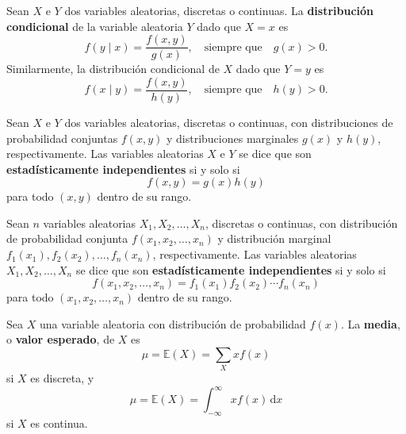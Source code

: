 \begin{definition}[]
Sean $X$ e $Y$ dos variables aleatorias, discretas o continuas. La \textbf{distribución condicional} de la variable aleatoria $Y$ dado que $X=x$ es
\begin{equation*}
f\left(y\mid x\right)=\frac{f\left(x,y\right)}{g(x)},\quad\text{siempre que}\quad g(x)>0.
\end{equation*}
Similarmente, la distribución condicional de $X$ dado que $Y=y$ es
\begin{equation*}
f\left(x\mid y\right)=\frac{f\left(x,y\right)}{h(y)},\quad\text{siempre que}\quad h(y)>0.
\end{equation*}
\end{definition}

\begin{definition}[]
Sean $X$ e $Y$ dos variables aleatorias, discretas o continuas, con distribuciones de probabilidad conjuntas $f(x,y)$ y distribuciones marginales $g(x)$ y $h(y)$, respectivamente. Las variables aleatorias $X$ e $Y$ se dice que son \textbf{estadísticamente independientes} si y solo si
\begin{equation*}
f\left(x,y\right)=g(x)h(y)
\end{equation*}
para todo $\left(x,y\right)$ dentro de su rango.
\end{definition}

\begin{definition}[]
Sean $n$ variables aleatorias $X_{1}, X_{2},\ldots, X_{n}$, discretas o continuas, con distribución de probabilidad conjunta $f\left(x_{1},x_{2},\ldots,x_{n}\right)$ y distribución marginal $f_{1}\left(x_{1}\right), f_{2}\left(x_{2}\right),\ldots,f_{n}\left(x_{n}\right)$, respectivamente. Las variables aleatorias $X_{1}, X_{2}, \ldots, X_{n}$ se dice que son \textbf{estadísticamente independientes} si y solo si
\begin{equation*}
f\left(x_{1},x_{2},\ldots,x_{n}\right)=f_{1}\left(x_{1}\right)f_{2}\left(x_{2}\right)\cdots f_{n}\left(x_{n}\right)
\end{equation*}
para todo $\left(x_{1},x_{2},\ldots, x_{n}\right)$ dentro de su rango.
\end{definition}

\begin{definition}[]
Sea $X$ una variable aleatoria con distribución de probabilidad $f(x)$. La \textbf{media}, o \textbf{valor esperado}, de $X$ es
\begin{equation*}
\mu=\mathds{E}\left(X\right)=\sum_{X}xf(x)
\end{equation*}
si $X$ es discreta, y
\begin{equation*}
\mu=\mathds{E}\left(X\right)=\int_{-\infty}^{\infty}xf(x)\,\mathrm{d}x
\end{equation*}
si $X$ es continua.
\end{definition}

